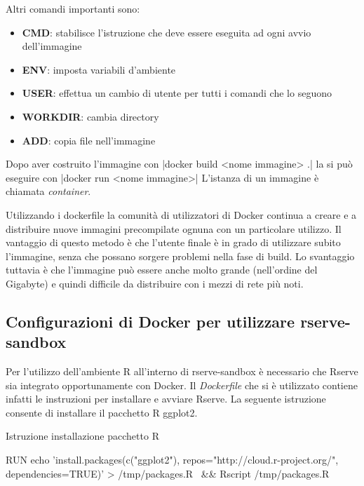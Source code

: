 \documentclass[10pt,titlepage,twoside,a4paper]{report}
\newenvironment{code}{\singlespacing\captionsetup{type=listing}}{}
\begin{document}
Altri comandi importanti sono:
\begin{itemize}
    \item \textbf{CMD}: stabilisce l'istruzione che deve essere 
eseguita ad ogni avvio dell'immagine
    \item \textbf{ENV}: imposta variabili d'ambiente
    \item \textbf{USER}: effettua un cambio di utente per tutti i comandi che lo seguono
    \item \textbf{WORKDIR}: cambia directory
    \item \textbf{ADD}: copia file nell'immagine
\end{itemize}

Dopo aver costruito l'immagine con |docker build <nome 
immagine> .|
la si può eseguire con |docker run <nome immagine>|
L'istanza di un immagine è chiamata \emph{container}.

Utilizzando i dockerfile la comunità di utilizzatori di Docker continua a 
creare e a distribuire nuove immagini precompilate ognuna con un particolare 
utilizzo.
Il vantaggio di questo metodo è che l'utente finale è in grado di utilizzare 
subito l'immagine, senza che possano sorgere problemi nella fase di build. Lo 
svantaggio tuttavia è che l'immagine può  essere anche molto grande 
(nell'ordine del Gigabyte) e quindi difficile da distribuire con i mezzi di 
rete più noti.

    \subsection{Configurazioni di Docker per utilizzare rserve-sandbox}
Per l'utilizzo dell'ambiente R all'interno di rserve-sandbox è necessario che 
Rserve sia integrato opportunamente con Docker. Il \emph{Dockerfile} che si 
è utilizzato contiene infatti le instruzioni per installare e avviare Rserve.
La seguente istruzione consente di installare il pacchetto R ggplot2.

\begin{minipage}{\textwidth}
\centering
\begin{code}
    \caption{Istruzione installazione pacchetto R}
    \begin{shellcode*}{}
RUN echo 'install.packages(c("ggplot2"), repos="http://cloud.r-project.org/", dependencies=TRUE)' > /tmp/packages.R \
    && Rscript /tmp/packages.R
    \end{shellcode*}
\end{code}
\end{minipage}
\end{document}
